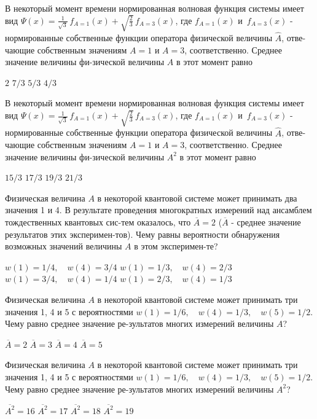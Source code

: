 \documentclass[11pt,a4paper]{exam}
\begin{document}
\begin{questions}
\question В некоторый момент времени нормированная волновая функция системы имеет вид $\Psi (x) = \frac{1}{{\sqrt 3 }}\,{f_{A = 1}}(x) + \sqrt {\frac{2}{3}} \,{f_{A = 3}}(x)$, где ${f_{A = 1}}(x)$ и $\,{f_{A = 3}}(x)$ - нормированные собственные функции оператора физической величины $\hat A$, отве-чающие собственным значениям $A = 1$ и $A = 3$, соответственно. Среднее значение величины фи-зической величины $A$ в этот момент равно 
\begin{choices}
\choice $2$       
\choice $7/3$        
\choice $5/3$     
\choice $4/3$
\end{choices}

\question В некоторый момент времени нормированная волновая функция системы имеет вид $\Psi (x) = \frac{1}{{\sqrt 3 }}\,{f_{A = 1}}(x) + \sqrt {\frac{2}{3}} \,{f_{A = 3}}(x)$, где ${f_{A = 1}}(x)$ и $\,{f_{A = 3}}(x)$ - нормированные собственные функции оператора физической величины $\hat A$, отве-чающие собственным значениям $A = 1$ и $A = 3$, соответственно. Среднее значение величины фи-зической величины ${A^2}$ в этот момент равно 
\begin{choices}
\choice $15/3$    
\choice $17/3$    
\choice $19/3$    
\choice $21/3$
\end{choices}

\question Физическая величина $A$ в некоторой квантовой системе может принимать два значения 1 и 4. В результате проведения многократных измерений над ансамблем тождественных квантовых сис-тем оказалось, что $\overline A  = 2$ ($\overline A $ - среднее значение результатов этих эксперимен-тов). Чему равны вероятности обнаружения возможных значений величины $A$ в этом эксперимен-те?
\begin{choices}
\choice $w(1) = 1/4,\quad w(4) = 3/4$        
\choice $w(1) = 1/3,\quad w(4) = 2/3$
\choice $w(1) = 3/4,\quad w(4) = 1/4$        
\choice $w(1) = 2/3,\quad w(4) = 1/3$
\end{choices}

\question Физическая величина $A$ в некоторой квантовой системе может принимать три значения 1, 4 и 5 с вероятностями $w(1) = 1/6,\quad w(4) = 1/3,\quad w(5) = 1/2$. Чему равно среднее значение ре-зультатов многих измерений величины $A$?
\begin{choices}
\choice $\overline A  = 2$    
\choice $\overline A  = 3$    
\choice $\overline A  = 4$    
\choice $\overline A  = 5$
\end{choices}

\question Физическая величина $A$ в некоторой квантовой системе может принимать три значения 1, 4 и 5 с вероятностями $w(1) = 1/6,\quad w(4) = 1/3,\quad w(5) = 1/2$. Чему равно среднее значение ре-зультатов многих измерений величины ${A^2}$?
\begin{choices}
\choice $\overline {{A^2}}  = 16$      
\choice $\overline {{A^2}}  = 17$      
\choice $\overline {{A^2}}  = 18$      
\choice $\overline {{A^2}}  = 19$
\end{choices}


\end{questions}
\end{document}
